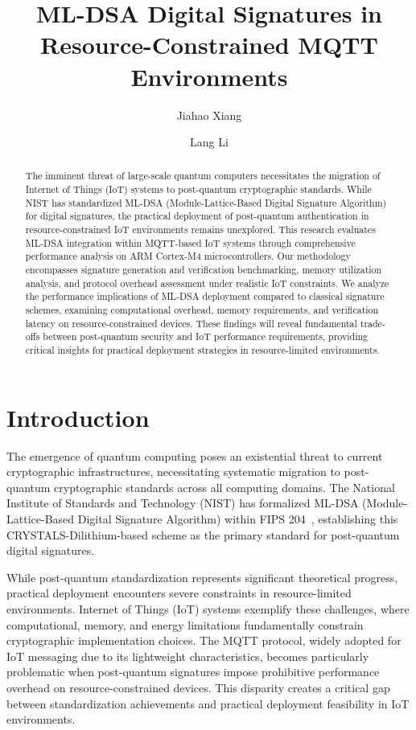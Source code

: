 \documentclass[journal=tches,final]{iacrtrans}
\author{Jiahao Xiang\inst{1} \and Lang Li\inst{1}}
\institute{
  Hengyang Normal University, College of Computer Science and Technology, Hengyang, China
}
\title[ML-DSA Digital Signatures in Resource-Constrained MQTT Environments]{ML-DSA Digital Signatures in Resource-Constrained MQTT Environments}
\begin{document}
\maketitle


\begin{abstract}
  The imminent threat of large-scale quantum computers necessitates the migration of Internet of Things (IoT) systems to post-quantum cryptographic standards. While NIST has standardized ML-DSA (Module-Lattice-Based Digital Signature Algorithm) for digital signatures, the practical deployment of post-quantum authentication in resource-constrained IoT environments remains unexplored. This research evaluates ML-DSA integration within MQTT-based IoT systems through comprehensive performance analysis on ARM Cortex-M4 microcontrollers. Our methodology encompasses signature generation and verification benchmarking, memory utilization analysis, and protocol overhead assessment under realistic IoT constraints. We analyze the performance implications of ML-DSA deployment compared to classical signature schemes, examining computational overhead, memory requirements, and verification latency on resource-constrained devices. These findings will reveal fundamental trade-offs between post-quantum security and IoT performance requirements, providing critical insights for practical deployment strategies in resource-limited environments.
\end{abstract}

\section{Introduction}

The emergence of quantum computing poses an existential threat to current cryptographic infrastructures, necessitating systematic migration to post-quantum cryptographic standards across all computing domains. The National Institute of Standards and Technology (NIST) has formalized ML-DSA (Module-Lattice-Based Digital Signature Algorithm) within FIPS 204~\cite{NIST-FIPS-204}, establishing this CRYSTALS-Dilithium-based scheme as the primary standard for post-quantum digital signatures.

While post-quantum standardization represents significant theoretical progress, practical deployment encounters severe constraints in resource-limited environments. Internet of Things (IoT) systems exemplify these challenges, where computational, memory, and energy limitations fundamentally constrain cryptographic implementation choices. The MQTT protocol, widely adopted for IoT messaging due to its lightweight characteristics, becomes particularly problematic when post-quantum signatures impose prohibitive performance overhead on resource-constrained devices. This disparity creates a critical gap between standardization achievements and practical deployment feasibility in IoT environments.
\end{document}
